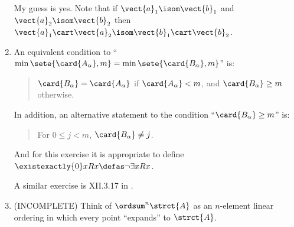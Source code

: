 \begin{enumerate}[1.]
My guess is yes. Note that if $\vect{a}_1 \isom \vect{b}_1$ and $\vect{a}_2 \isom \vect{b}_2$ then $\vect{a}_1 \cart \vect{a}_2 \isom \vect{b}_1 \cart \vect{b}_2$.
%
\item {} An equivalent condition to ``$\min\sete{\card{A_\alpha}, m} = \min\sete{\card{B_\alpha}, m}$'' is:
\begin{quote}
$\card{B_\alpha} = \card{A_\alpha}$ if $\card{A_\alpha} < m$, and $\card{B_\alpha} \geq m$ otherwise.
\end{quote}
In addition, an alternative statement to the condition ``$\card{B_\alpha} \geq m$'' is:
\begin{quote}
For $0 \leq j < m$, $\card{B_\alpha} \neq j$.
\end{quote}
And for this exercise it is appropriate to define $\existexactly{0}x Rx \defas \neg\exists x Rx$.
\begin{remark}
A similar exercise is XII.3.17 in \cite{EFT}.
\end{remark}
%
\item {} (INCOMPLETE)
Think of $\ordsum^n \strct{A}$ as an $n$-element linear ordering in which every point ``expands'' to $\strct{A}$.


\end{enumerate}
